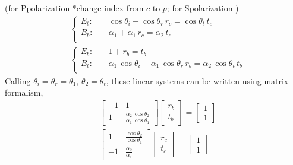 \documentclass[letterpaper,10pt,english]{jupyterBook}
\begin{document}
\sphinxAtStartPar
(for P\sphinxhyphen{}polarization  *change index from \(c\) to \(p\); for S\sphinxhyphen{}polarization  )
\begin{equation*}
\begin{split}
& \begin{cases}
 E_t: & \quad  \cos \theta_i -  \cos \theta_r \, r_c = \cos \theta_{t} \, t_c \\
 B_b: & \quad  \alpha_1      +  \alpha_1      \, r_c =  \alpha_2       \, t_c \\
\end{cases}
\\
& \begin{cases}
 E_b: & \quad                          1 +                   r_b =  t_b \\
 B_t: & \quad  \alpha_1 \, \cos \theta_i -  \alpha_1 \, \cos \theta_r \, r_b = \alpha_2 \, \cos \theta_{t} \, t_b \\
\end{cases}
\end{split}
\end{equation*}
\sphinxAtStartPar
Calling \(\theta_i = \theta_r = \theta_1\), \(\theta_2 = \theta_t\), these linear systems can be written using matrix formalism,
\begin{equation*}
\begin{split}
& \begin{bmatrix} -1 & 1 \\ 1 & \frac{\alpha_2}{\alpha_1} \frac{\cos \theta_2}{\cos \theta_1} \end{bmatrix}
 \begin{bmatrix} r_b \\ t_b \end{bmatrix} = \begin{bmatrix} 1 \\ 1 \end{bmatrix}
\\
& \begin{bmatrix} 1 & \frac{\cos \theta_2}{\cos \theta_1} \\ -1 & \frac{\alpha_2}{\alpha_1} \end{bmatrix}
 \begin{bmatrix} r_c \\ t_c \end{bmatrix} = \begin{bmatrix} 1 \\ 1 \end{bmatrix}
\end{split}
\end{equation*}
\end{document}
